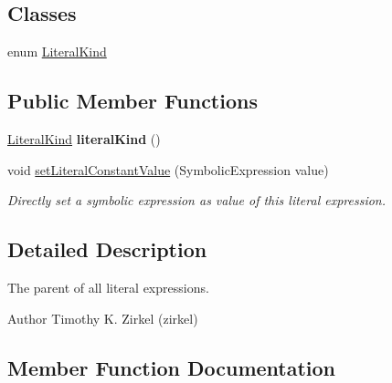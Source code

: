 \subsection*{Classes}
\begin{DoxyCompactItemize}
\item 
enum \hyperlink{enumedu_1_1udel_1_1cis_1_1vsl_1_1civl_1_1model_1_1IF_1_1expression_1_1LiteralExpression_1_1LiteralKind}{Literal\+Kind}
\end{DoxyCompactItemize}
\subsection*{Public Member Functions}
\begin{DoxyCompactItemize}
\item 
\hypertarget{interfaceedu_1_1udel_1_1cis_1_1vsl_1_1civl_1_1model_1_1IF_1_1expression_1_1LiteralExpression_af3e6931637c319b9709fd20c9549f2f2}{}\hyperlink{enumedu_1_1udel_1_1cis_1_1vsl_1_1civl_1_1model_1_1IF_1_1expression_1_1LiteralExpression_1_1LiteralKind}{Literal\+Kind} {\bfseries literal\+Kind} ()\label{interfaceedu_1_1udel_1_1cis_1_1vsl_1_1civl_1_1model_1_1IF_1_1expression_1_1LiteralExpression_af3e6931637c319b9709fd20c9549f2f2}

\item 
void \hyperlink{interfaceedu_1_1udel_1_1cis_1_1vsl_1_1civl_1_1model_1_1IF_1_1expression_1_1LiteralExpression_a0383d66609b82b4ff9ac8e04e80a9fcf}{set\+Literal\+Constant\+Value} (Symbolic\+Expression value)
\begin{DoxyCompactList}\small\item\em Directly set a symbolic expression as value of this literal expression. \end{DoxyCompactList}\end{DoxyCompactItemize}


\subsection{Detailed Description}
The parent of all literal expressions. 

\begin{DoxyAuthor}{Author}
Timothy K. Zirkel (zirkel) 
\end{DoxyAuthor}


\subsection{Member Function Documentation}
\hypertarget{interfaceedu_1_1udel_1_1cis_1_1vsl_1_1civl_1_1model_1_1IF_1_1expression_1_1LiteralExpression_a0383d66609b82b4ff9ac8e04e80a9fcf}{}
